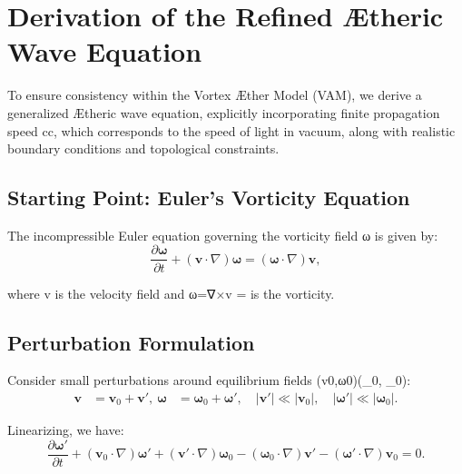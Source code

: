 

\section{Derivation of the Refined Ætheric Wave Equation}


To ensure consistency within the Vortex Æther Model (VAM), we derive a generalized Ætheric wave equation, explicitly incorporating finite propagation speed cc, which corresponds to the speed of light in vacuum, along with realistic boundary conditions and topological constraints.


\subsection{Starting Point: Euler's Vorticity Equation}


The incompressible Euler equation governing the vorticity field ω\boldsymbol{\omega} is given by:
\begin{equation}
    \frac{\partial \boldsymbol{\omega}}{\partial t} + (\mathbf{v}\cdot\nabla)\boldsymbol{\omega} = (\boldsymbol{\omega}\cdot\nabla)\mathbf{v},
\end{equation}


where v is the velocity field and ω=∇×v\boldsymbol{\omega} = \nabla \times {} is the vorticity.


\subsection{Perturbation Formulation}


Consider small perturbations around equilibrium fields (v0,ω0)(_0, \boldsymbol{\omega}_0):
\begin{align}
    \mathbf{v} &= \mathbf{v}_0 + \mathbf{v}',\
    \boldsymbol{\omega} &= \boldsymbol{\omega}_0 + \boldsymbol{\omega}', \quad |\mathbf{v}'| \ll |\mathbf{v}_0|, \quad |\boldsymbol{\omega}'| \ll |\boldsymbol{\omega}_0|.
\end{align}


Linearizing, we have:
\begin{equation}
    \frac{\partial \boldsymbol{\omega}'}{\partial t} + (\mathbf{v}_0 \cdot \nabla)\boldsymbol{\omega}' + (\mathbf{v}' \cdot \nabla)\boldsymbol{\omega}_0 - (\boldsymbol{\omega}_0\cdot\nabla)\mathbf{v}' - (\boldsymbol{\omega}'\cdot\nabla)\mathbf{v}_0 = 0.
\end{equation}


